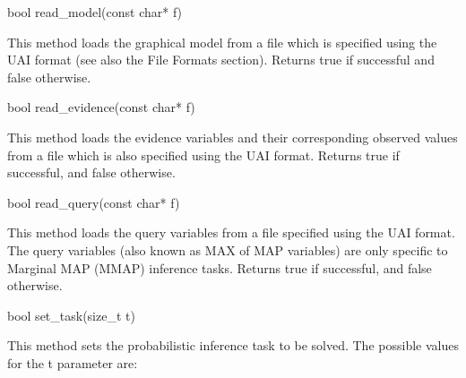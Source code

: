 \begin{DoxyVerb}    bool read_model(const char* f)
\end{DoxyVerb}
 This method loads the graphical model from a file which is specified using the U\+AI format (see also the File Formats section). Returns {\ttfamily true} if successful and {\ttfamily false} otherwise. \begin{DoxyVerb}    bool read_evidence(const char* f)
\end{DoxyVerb}
 This method loads the evidence variables and their corresponding observed values from a file which is also specified using the U\+AI format. Returns {\ttfamily true} if successful, and {\ttfamily false} otherwise. \begin{DoxyVerb}    bool read_query(const char* f)
\end{DoxyVerb}
 This method loads the query variables from a file specified using the U\+AI format. The query variables (also known as M\+AX of M\+AP variables) are only specific to Marginal M\+AP (M\+M\+AP) inference tasks. Returns {\ttfamily true} if successful, and {\ttfamily false} otherwise. \begin{DoxyVerb}    bool set_task(size_t t)
\end{DoxyVerb}
 This method sets the probabilistic inference task to be solved. The possible values for the {\ttfamily t} parameter are\+:
